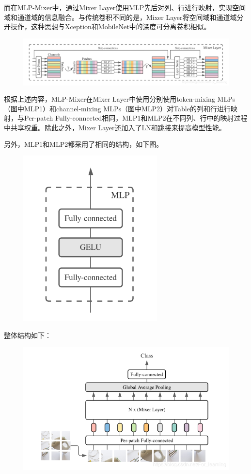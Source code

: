 \documentclass{ctexart}
\begin{document}
\par 而在MLP-Mixer中，通过Mixer Layer使用MLP先后对列、行进行映射，实现空间域和通道域的信息融合。与传统卷积不同的是，Mixer Layer将空间域和通道域分开操作，这种思想与Xception和MobileNet中的深度可分离卷积相似。
\begin{figure}[htbp]
    \centering
    \includegraphics[scale=0.5]{mix1.png}

\end{figure}
\par 根据上述内容，MLP-Mixer在Mixer Layer中使用分别使用token-mixing MLPs（图中MLP1）和channel-mixing MLPs（图中MLP2）对Table的列和行进行映射，与Per-patch Fully-connected相同，MLP1和MLP2在不同列、行中的映射过程中共享权重。除此之外，Mixer Layer还加入了LN和跳接来提高模型性能。

\par 另外，MLP1和MLP2都采用了相同的结构，如下图。
\begin{figure}[H]
    \centering
    \includegraphics[scale=0.5]{mix2.png}

\end{figure}
\par 整体结构如下：
\begin{figure}[H]
    \centering
    \includegraphics[scale=0.5]{mix3.png}

\end{figure}
\end{document}
